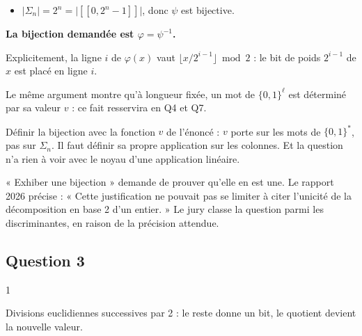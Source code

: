 \documentclass[11pt,a4paper]{article}
\providecommand{\tightlist}{\setlength{\itemsep}{0pt}\setlength{\parskip}{0pt}}
\newcommand{\equationajustee}[1]{%
  \sbox{\boiteequation}{$\displaystyle #1$}%
  \ifdim\wd\boiteequation>\linewidth
    \[\resizebox{\linewidth}{!}{\usebox{\boiteequation}}\]%
  \else
    \[#1\]%
  \fi}
\begin{document}
\equationajustee{\begin{aligned}
\psi(a)-\psi(b)&\ge2^{i_0-1}-\sum_{i<i_0}2^{i-1}\\
&=1>0.
\end{aligned}}

\begin{itemize}
\tightlist
\item
  \(|\Sigma_n|=2^n=\big|[\![0,2^n-1]\!]\big|\), donc \(\psi\) est bijective.
\end{itemize}

\textbf{La bijection demandée est \(\varphi=\psi^{-1}\).}

Explicitement, la ligne \(i\) de \(\varphi(x)\) vaut \(\lfloor x/2^{i-1}\rfloor\bmod 2\) : le bit de poids \(2^{i-1}\) de \(x\) est placé en ligne \(i\).

Le même argument montre qu'à longueur fixée, un mot de \(\{0,1\}^\ell\) est déterminé par sa valeur \(v\) : ce fait resservira en Q4 et Q7.

\begin{piege}

Définir la bijection avec la fonction \(v\) de l'énoncé : \(v\) porte sur les mots de \(\{0,1\}^*\), pas sur \(\Sigma_n\). Il faut définir sa propre application sur les colonnes. Et la question n'a rien à voir avec le noyau d'une application linéaire.

\end{piege}

\begin{jury}

« Exhiber une bijection » demande de prouver qu'elle en est une. Le rapport 2026 précise : « Cette justification ne pouvait pas se limiter à citer l'unicité de la décomposition en base 2 d'un entier. » Le jury classe la question parmi les discriminantes, en raison de la précision attendue.

\end{jury}

\hypertarget{question-3}{%
\subsection{Question 3}\label{question-3}}

\begin{indication}{1}

Divisions euclidiennes successives par 2 : le reste donne un bit, le quotient devient la nouvelle valeur.

\end{indication}
\end{document}
